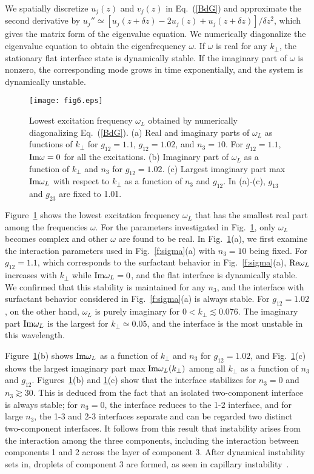 \documentclass[pra,aps,superscriptaddress,twocolumn,color]{revtex4-1}
\begin{document}
We spatially discretize $u_j(z)$ and $v_j(z)$ in Eq.~(\ref{BdG}) and
approximate the second derivative by $u_j'' \simeq [u_j(z + \delta z) - 2
u_j(z) + u_j(z + \delta z)] / \delta z^2$, which gives the matrix form of
the eigenvalue equation.
We numerically diagonalize the eigenvalue equation to obtain the
eigenfrequency $\omega$.
If $\omega$ is real for any $k_\perp$, the stationary flat interface state
is dynamically stable.
If the imaginary part of $\omega$ is nonzero, the corresponding mode grows
in time exponentially, and the system is dynamically unstable.

\begin{figure}[tb]
\texttt{[image: fig6.eps]}
\caption{
  Lowest excitation frequency $\omega_L$ obtained by numerically
  diagonalizing Eq.~(\ref{BdG}).
  (a) Real and imaginary parts of $\omega_L$ as functions of $k_\perp$ for
  $g_{12} = 1.1$, $g_{12} = 1.02$, and $n_3 = 10$.
  For $g_{12} = 1.1$, ${\rm Im} \omega = 0$ for all the excitations.
  (b) Imaginary part of $\omega_L$ as a function of $k_\perp$ and $n_3$ for
  $g_{12} = 1.02$.
  (c) Largest imaginary part max ${\rm Im} \omega_L$ with respect to
  $k_\perp$ as a function of $n_3$ and $g_{12}$.
  In (a)-(c), $g_{13}$ and $g_{23}$ are fixed to 1.01.
}
\label{f:bogo}
\end{figure}
Figure~\ref{f:bogo} shows the lowest excitation frequency $\omega_L$ that
has the smallest real part among the frequencies $\omega$.
For the parameters investigated in Fig.~\ref{f:bogo}, only $\omega_L$
becomes complex and other $\omega$ are found to be real.
In Fig.~\ref{f:bogo}(a), we first examine the interaction parameters used in
Fig.~\ref{f:sigma}(a) with $n_3 = 10$ being fixed.
For $g_{12} = 1.1$, which corresponds to the surfactant behavior in
Fig.~\ref{f:sigma}(a), ${\rm Re} \omega_L$ increases with $k_\perp$ while
${\rm Im} \omega_L = 0$, and the flat interface is dynamically stable.
We confirmed that this stability is maintained for any $n_3$, and the
interface with surfactant behavior considered in Fig.~\ref{f:sigma}(a) is
always stable.
For $g_{12} = 1.02$, on the other hand, $\omega_L$ is purely imaginary for
$0 < k_\perp \lesssim 0.076$.
The imaginary part ${\rm Im} \omega_L$ is the largest for $k_\perp \simeq
0.05$, and the interface is the most unstable in this wavelength.

Figure~\ref{f:bogo}(b) shows ${\rm Im} \omega_L$ as a function of $k_\perp$
and $n_3$ for $g_{12} = 1.02$, and Fig.~\ref{f:bogo}(c) shows the largest
imaginary part max ${\rm Im} \omega_L(k_\perp)$ among all $k_\perp$ as a
function of $n_3$ and $g_{12}$.
Figures~\ref{f:bogo}(b) and \ref{f:bogo}(c) show that the interface
stabilizes for $n_3 = 0$ and $n_3 \gtrsim 30$.
This is deduced from the fact that an isolated two-component interface is
always stable;
for $n_3 = 0$, the interface reduces to the 1-2 interface, and for large
$n_3$, the 1-3 and 2-3 interfaces separate and can be regarded two distinct
two-component interfaces.
It follows from this result that instability arises from the interaction
among the three components, including the interaction between components 1
and 2 across the layer of component 3.
After dynamical instability sets in, droplets of component 3 are formed,
as seen in capillary instability~\cite{Sasaki11}.
\end{document}
